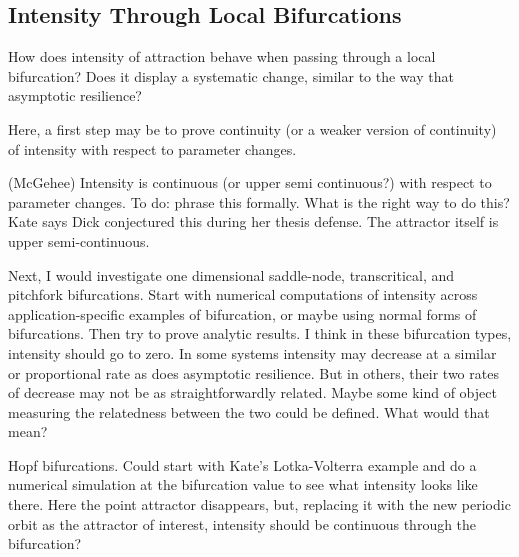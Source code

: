 
\subsection{Intensity Through Local Bifurcations}

How does intensity of attraction behave when passing through a local bifurcation? Does it display a systematic change, similar to the way that asymptotic resilience? 


Here, a first step may be to prove continuity (or a weaker version of continuity) of intensity with respect to parameter changes. 

\begin{conjecture}(McGehee)
	Intensity is continuous (or upper semi continuous?) with respect to parameter changes. To do: phrase this formally. What is the right way to do this? Kate says Dick conjectured this during her thesis defense. The attractor itself is upper semi-continuous. 
\end{conjecture}

Next, I would investigate one dimensional saddle-node, transcritical, and pitchfork bifurcations. 
%
Start with numerical computations of intensity across application-specific examples of bifurcation, or maybe using normal forms of bifurcations. Then try to prove analytic results. 
%
I think in these bifurcation types, intensity should go to zero. In some systems intensity may decrease at a similar or proportional rate as does asymptotic resilience. But in others, their two rates of decrease may not be as straightforwardly related. Maybe some kind of object measuring the relatedness between the two could be defined. What would that mean?



Hopf bifurcations. Could start with Kate's Lotka-Volterra example and do a numerical simulation at the bifurcation value to see what intensity looks like there. Here the point attractor disappears, but, replacing it with the new periodic orbit as the attractor of interest, intensity should be continuous through the bifurcation?  %

